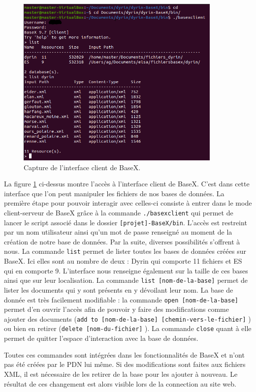 \documentclass[a4paper,12pt,twoside]{book}
\begin{document}
    \begin{figure}[H]
    \centering
    \includegraphics[width=10cm]{img/partie_1/basex_client.png}
    \caption{Capture de l'interface client de BaseX.}
    \label{bx}
\end{figure}
    
    La figure \ref{bx} ci-dessus montre l'accès à l'interface client de BaseX. C'est dans cette interface que l'on peut manipuler les fichiers de nos bases de données.
    La première étape pour pouvoir interagir avec celles-ci consiste à entrer dans le mode client-serveur de BaseX grâce à la commande \texttt{./basexclient} qui permet de lancer le script associé dans le dossier \texttt{[projet]-BaseX/bin}. L'accès est restreint par un nom utilisateur ainsi qu'un mot de passe renseigné au moment de la création de notre base de données. Par la suite, diverses possibilités s'offrent à nous. La commande \texttt{list} permet de lister toutes les bases de données créées sur BaseX. Ici elles sont au nombre de deux : Dyrin qui comporte 11 fichiers et ES qui en comporte 9. L'interface nous renseigne également sur la taille de ces bases ainsi que sur leur localisation. La commande \texttt{list [nom-de-la-base]} permet de lister les documents qui y sont présents en y dévoilant leur nom. La base de donnée est très facilement modifiable : la commande \texttt{open [nom-de-la-base]} permet d'en ouvrir l'accès afin de pouvoir y faire des modifications comme ajouter des documents (\texttt{add to [nom-de-la-base] [chemin-vers-le-fichier]} ) ou bien en retirer (\texttt{delete [nom-du-fichier]} ). La commande \texttt{close} quant à elle permet de quitter l'espace d'interaction avec la base de données.
    
    Toutes ces commandes sont intégrées dans les fonctionnalités de BaseX et n'ont pas été créées par le \acrshort{PDN} lui même. Si des modifications sont faites aux fichiers XML, il est nécessaire de les retirer de la base pour les ajouter à nouveau. Le résultat de ces changement est alors visible lors de la connection au site web.
    
\end{document}
